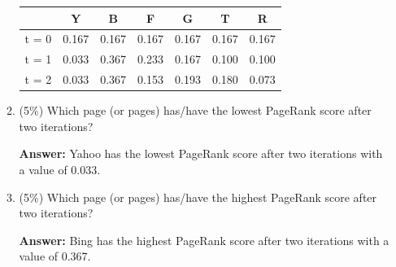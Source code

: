 \documentclass[11pt]{article}
\begin{document}
\begin{enumerate}
\begin{enumerate}
                    \begin{table}[!ht]
                        \centering
                        \begin{tabular}[t]{|c|c|c|c|c|c|c|}
                            \hline
                                  & \textbf{Y} & \textbf{B} & \textbf{F} & \textbf{G} & \textbf{T} & \textbf{R} \\
                            \hline
                            t = 0 & 0.167      & 0.167      & 0.167      & 0.167      & 0.167      & 0.167
                            \\ \hline
                            t = 1 & 0.033      & 0.367      & 0.233      & 0.167      & 0.100      & 0.100
                            \\ \hline
                            t = 2 & 0.033      & 0.367      & 0.153      & 0.193      & 0.180      & 0.073
                            \\ \hline
                        \end{tabular}
                    \end{table}

              \item (5\%) Which page (or pages) has/have the lowest PageRank score after two iterations?

                    \textbf{Answer:} Yahoo has the lowest PageRank score after two iterations with a value of 0.033.

              \item (5\%) Which page (or pages) has/have the highest PageRank score after two iterations?

                    \textbf{Answer:} Bing has the highest PageRank score after two iterations with a value of 0.367.

          \end{enumerate}

\end{enumerate}
\end{document}
